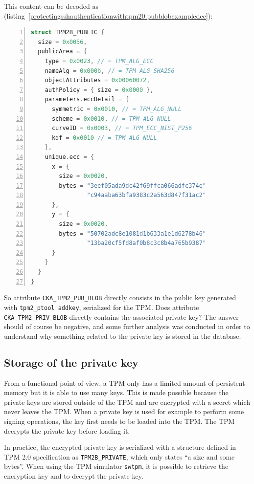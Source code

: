 This content can be decoded as
(listing~\ref{protectingsshauthenticationwithtpm20:pubblobexampledec}):

\begin{lstlisting}[language=C, numbers=left, caption={Deserialization of an example of generated public key blob}, label=protectingsshauthenticationwithtpm20:pubblobexampledec]
struct TPM2B_PUBLIC {
  size = 0x0056,
  publicArea = {
    type = 0x0023, // = TPM_ALG_ECC
    nameAlg = 0x000b, // = TPM_ALG_SHA256
    objectAttributes = 0x00060072,
    authPolicy = { size = 0x0000 },
    parameters.eccDetail = {
      symmetric = 0x0010, // = TPM_ALG_NULL
      scheme = 0x0010, // = TPM_ALG_NULL
      curveID = 0x0003, // = TPM_ECC_NIST_P256
      kdf = 0x0010 // = TPM_ALG_NULL
    },
    unique.ecc = {
      x = {
        size = 0x0020,
        bytes = "3eef05ada9dc42f69ffca066adfc374e"
                "c94aaba63bfa9383c2a563d847f31ac2"
      },
      y = {
        size = 0x0020,
        bytes = "50702adc8e1081d1b633a1e1d6278b46"
                "13ba20cf5fd8af0b8c3c8b4a765b9387"
      }
    }
  }
}
\end{lstlisting}

So attribute \texttt{CKA\_TPM2\_PUB\_BLOB} directly
consists in the public key generated with
\texttt{tpm2\_ptool addkey}, serialized for the TPM.
Does attribute \texttt{CKA\_TPM2\_PRIV\_BLOB} directly
contains the associated private key? The answer should of course be
negative, and some further analysis was conducted in order to understand
why something related to the private key is stored in the database.

\subsection{Storage of the private key}

From a functional point of view, a TPM only has a limited amount of
persistent memory but it is able to use many keys. This is made possible
because the private keys are stored outside of the TPM and are encrypted
with a secret which never leaves the TPM. When a private key is used for
example to perform some signing operations, the key first needs to be
loaded into the TPM. The TPM decrypts the private key before loading it.

In practice, the encrypted private key is serialized with a structure
defined in TPM 2.0 specification as
\texttt{TPM2B\_PRIVATE}, which only states ``a size and
some bytes''. When using the TPM simulator
\texttt{swtpm}, it is possible to retrieve the
encryption key and to decrypt the private key.

